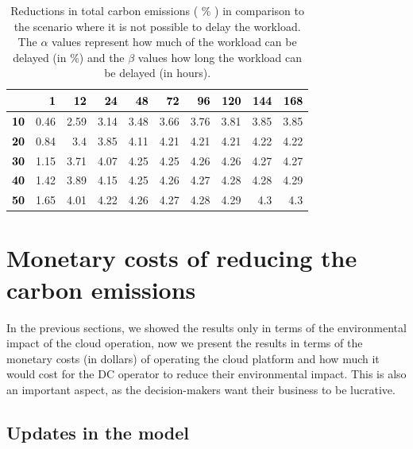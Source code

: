 \begin{table}[h]
\caption{Reductions in total carbon emissions ( \% ) in comparison to the scenario where it is not possible to delay the workload. The $\alpha$ values represent how much of the workload can be delayed (in \%) and the $\beta$ values how long the workload can be delayed (in hours). }\centering
\label{tab:flex_scheduling}
\begin{tabular}{|l|r|r|r|r|r|r|r|r|r|}
\hline
\backslashbox{$\alpha$}{$\beta$} &   \textcolor{black}{\textbf{ 1}} &  \textcolor{black}{\textbf{ 12 }} &  \textcolor{black}{\textbf{ 24 }} &  \textcolor{black}{\textbf{ 48 }}  &   \textcolor{black}{\textbf{ 72 }} &   \textcolor{black}{\textbf{ 96 }} &   \textcolor{black}{\textbf{ 120  }} &   \textcolor{black}{\textbf{ 144 }} &   \textcolor{black}{\textbf{ 168 }} \\ 
     \hline
 \textcolor{black}{ \textbf{10}}   &  0.46 &  2.59 &  3.14 &  3.48 &  3.66 &  3.76 &  3.81 &  3.85 &  3.85 \\ 
\hline
 \textcolor{black}{ \textbf{20}}   &  0.84 &  3.4 &  3.85 &  4.11 &  4.21 &  4.21 &  4.21 &  4.22 &  4.22 \\ 
\hline
 \textcolor{black}{ \textbf{30}}   &  1.15 &  3.71 &  4.07 &  4.25 &  4.25 &  4.26 &  4.26 &  4.27 &  4.27 \\ 
\hline
 \textcolor{black}{ \textbf{40}}   &  1.42 &  3.89 &  4.15 &  4.25 &  4.26 &  4.27 &  4.28 &  4.28 &  4.29 \\ 
\hline
 \textcolor{black}{ \textbf{50}}   &  1.65 &  4.01 &  4.22 &  4.26 &  4.27 &  4.28 &  4.29 &  4.3 &  4.3 \\ 
\hline
\end{tabular}
\end{table}


\section{ Monetary costs of reducing the carbon emissions}
\label{sec:costs}

In the previous sections, we showed the results only in terms of the environmental impact of the cloud operation, now we present the results in terms of the monetary costs (in dollars) of operating the cloud platform and how much it would cost for the DC operator to reduce their environmental impact. This is also an important aspect, as the decision-makers want their business to be lucrative.

\subsection{Updates in the model}

